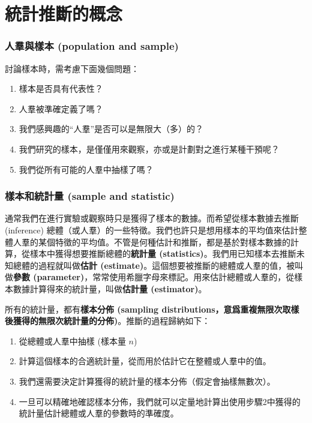 \documentclass[]{ctexbook}
\providecommand{\tightlist}{%
  \setlength{\itemsep}{0pt}\setlength{\parskip}{0pt}}
\begin{document}
\chapter{統計推斷的概念}

\subsection{人羣與樣本 (population and
sample)}\label{-population-and-sample}

討論樣本時，需考慮下面幾個問題：

\begin{enumerate}
\def\labelenumi{\arabic{enumi}.}
\tightlist
\item
  樣本是否具有代表性？
\item
  人羣被準確定義了嗎？
\item
  我們感興趣的``人羣''是否可以是無限大（多）的？
\item
  我們研究的樣本，是僅僅用來觀察，亦或是計劃對之進行某種干預呢？
\item
  我們從所有可能的人羣中抽樣了嗎？
\end{enumerate}

\subsection{樣本和統計量 (sample and
statistic)}\label{-sample-and-statistic}

通常我們在進行實驗或觀察時只是獲得了樣本的數據。而希望從樣本數據去推斷
(inference)
總體（或人羣）的一些特徵。我們也許只是想用樣本的平均值來估計整體人羣的某個特徵的平均值。不管是何種估計和推斷，都是基於對樣本數據的計算，從樣本中獲得想要推斷總體的\textbf{統計量
(statistics)}。我們用已知樣本去推斷未知總體的過程就叫做\textbf{估計
(estimate)}。這個想要被推斷的總體或人羣的值，被叫做\textbf{參數
(parameter)}，常常使用希臘字母來標記。用來估計總體或人羣的，從樣本數據計算得來的統計量，叫做\textbf{估計量
(estimator)}。

所有的統計量，都有\textbf{樣本分佈 (sampling
distributions，意爲重複無限次取樣後獲得的無限次統計量的分佈)}。推斷的過程歸納如下：

\begin{enumerate}
\def\labelenumi{\arabic{enumi}.}
\tightlist
\item
  從總體或人羣中抽樣 (樣本量 \(n\))
\item
  計算這個樣本的合適統計量，從而用於估計它在整體或人羣中的值。
\item
  我們還需要決定計算獲得的統計量的樣本分佈（假定會抽樣無數次）。
\item
  一旦可以精確地確認樣本分佈，我們就可以定量地計算出使用步驟2中獲得的統計量估計總體或人羣的參數時的準確度。
\end{enumerate}
\end{document}
